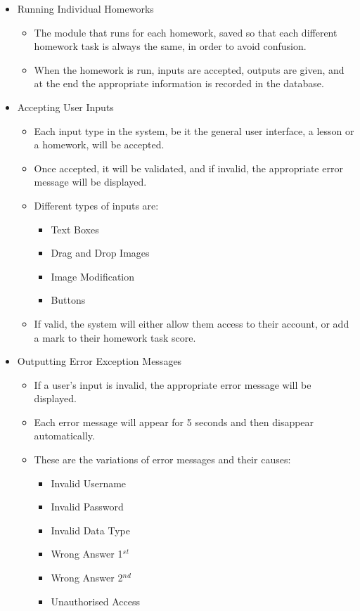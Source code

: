 \begin{itemize}
	\item Running Individual Homeworks
	\begin{itemize}
		\item The module that runs for each homework, saved so that each different homework task is always the same, in order to avoid confusion. 
		\item When the homework is run, inputs are accepted, outputs are given, and at the end the appropriate information is recorded in the database.
	\end{itemize}
\end{itemize}

\begin{itemize}
	\item Accepting User Inputs
	\begin{itemize}
		\item Each input type in the system, be it the general user interface, a lesson or a homework, will be accepted.
		\item Once accepted, it will be validated, and if invalid, the appropriate error message will be displayed.
		\item Different types of inputs are:
		\begin{itemize}
			\item Text Boxes
			\item Drag and Drop Images
			\item Image Modification
			\item Buttons 
		\end{itemize} 
		\item If valid, the system will either allow them access to their account, or add a mark to their homework task score.
	\end{itemize}
\end{itemize}

\begin{itemize}
	\item Outputting Error Exception Messages
	\begin{itemize}
		\item If a user's input is invalid, the appropriate error message will be displayed.
		\item Each error message will appear for 5 seconds and then disappear automatically.
		\item These are the variations of error messages and their causes:
		\begin{itemize}
			\item Invalid Username
			\item Invalid Password
			\item Invalid Data Type
			\item Wrong Answer 1{$^s$}{$^t$}
			\item Wrong Answer 2{$^n$}{$^d$}
			\item Unauthorised Access
		\end{itemize}
	\end{itemize}
\end{itemize}

